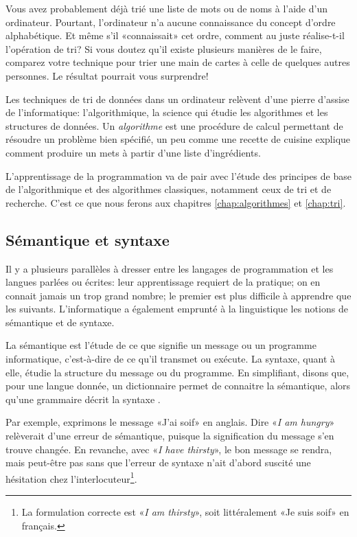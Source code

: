 Vous avez probablement déjà trié une liste de mots ou de noms à l'aide
d'un ordinateur. Pourtant, l'ordinateur n'a aucune connaissance du
concept d'ordre alphabétique. Et même s'il «connaissait» cet ordre,
comment au juste réalise-t-il l'opération de tri? Si vous doutez qu'il
existe plusieurs manières de le faire, comparez votre technique pour
trier une main de cartes à celle de quelques autres personnes. Le
résultat pourrait vous surprendre!

Les techniques de tri de données dans un ordinateur relèvent d'une
pierre d'assise de l'informatique:
l'algorithmique, la science qui étudie les
algorithmes et les structures de données. Un
\emph{algorithme} est une procédure de calcul
permettant de résoudre un problème bien spécifié, un peu comme une
recette de cuisine explique comment produire un mets à partir d'une
liste d'ingrédients.

L'apprentissage de la programmation va de pair avec l'étude des
principes de base de l'algorithmique et des algorithmes classiques,
notamment ceux de tri et de recherche. C'est ce que nous ferons aux
chapitres \ref{chap:algorithmes} et \ref{chap:tri}.

\subsection{Sémantique et syntaxe}
\label{sec:informatique:concepts:semantique}

Il y a plusieurs parallèles à dresser entre les langages de
programmation et les langues parlées ou écrites: leur apprentissage
requiert de la pratique; on en connait jamais un trop grand nombre; le
premier est plus difficile à apprendre que les suivants.
L'informatique a également emprunté à la linguistique les notions de
sémantique et de syntaxe.

La sémantique est l'étude de ce que signifie un message ou un
programme informatique, c'est-à-dire de ce qu'il transmet ou exécute.
La syntaxe, quant à elle, étudie la structure du message ou du
programme. En simplifiant, disons que, pour une langue donnée, un
dictionnaire permet de connaitre la sémantique, alors qu'une grammaire
décrit la syntaxe \citep{Hebenstreit:semantique}.

Par exemple, exprimons le message «J'ai soif» en anglais. Dire
«\emph{I am hungry}» relèverait d'une erreur de sémantique, puisque la
signification du message s'en trouve changée. En revanche, avec
«\emph{I have thirsty}», le bon message se rendra, mais peut-être pas
sans que l'erreur de syntaxe n'ait d'abord suscité une hésitation chez
l'interlocuteur\footnote{%
  La formulation correcte est «\emph{I am thirsty}», soit
  littéralement «Je suis soif» en français.}.

